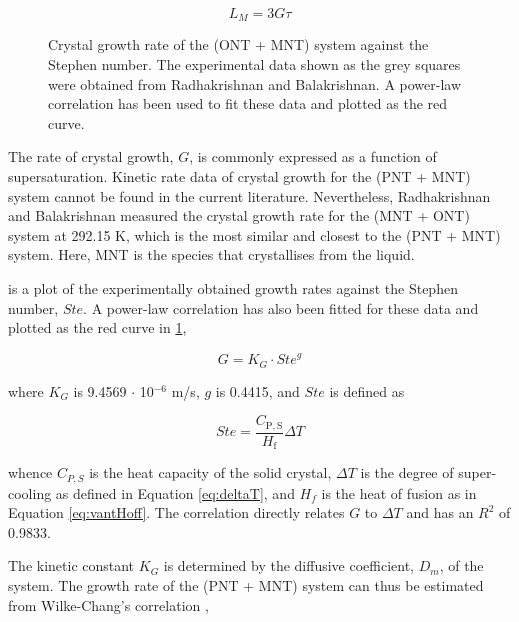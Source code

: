 \begin{equation} \label{eq:LM G tau}
    L_M = 3 G \tau
\end{equation}

\begin{figure}
    
    \caption{Crystal growth rate of the (ONT + MNT) system against the Stephen number. The experimental data shown as the grey squares were obtained from Radhakrishnan and Balakrishnan. \cite{radhakrishnan_kinetics_1999} A power-law correlation has been used to fit these data and plotted as the red curve.}
    \label{fig:ONT + MNT kinetics}
\end{figure}

The rate of crystal growth, $G$, is commonly expressed as a function of supersaturation. Kinetic rate data of crystal growth for the (PNT + MNT) system cannot be found in the current literature. Nevertheless, Radhakrishnan and Balakrishnan measured the crystal growth rate for the (MNT + ONT) system at 292.15 K, which is the most similar and closest to the (PNT + MNT) system. \cite{radhakrishnan_kinetics_1999} Here, MNT is the species that crystallises from the liquid.

 is a plot of the experimentally obtained growth rates against the Stephen number, $Ste$. A power-law correlation has also been fitted for these data and plotted as the red curve in \cref{fig:ONT + MNT kinetics},

\begin{equation}  \label{eq:KG Ste g}
    G = K_G \cdot {Ste}^{g}
\end{equation}

\noindent where $K_G$ is 9.4569 $\cdot$ 10$^{-6}$ m/s, $g$ is 0.4415, and $Ste$ is defined as 

\begin{equation}
    Ste = \frac{C_{\mathrm{P,S}}}{H_{\mathrm{f}}} \Delta T
\end{equation}

\noindent whence $C_{P,S}$ is the heat capacity of the solid crystal, $\Delta T$ is the degree of super-cooling as defined in Equation \ref{eq:deltaT}, and $H_{f}$ is the heat of fusion as in Equation \ref{eq:vantHoff}. The correlation directly relates $G$ to $\Delta T$ and has an $R^2$ of 0.9833.

The kinetic constant $K_G$ is determined by the diffusive coefficient, $D_m$, of the system. The growth rate of the (PNT + MNT) system can thus be estimated from Wilke-Chang's correlation \cite{miyabe_estimation_2011},

